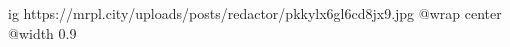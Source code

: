  
 
 
 
 

\ifcmt
  ig https://mrpl.city/uploads/posts/redactor/pkkylx6gl6cd8jx9.jpg
  @wrap center
  @width 0.9
\fi
